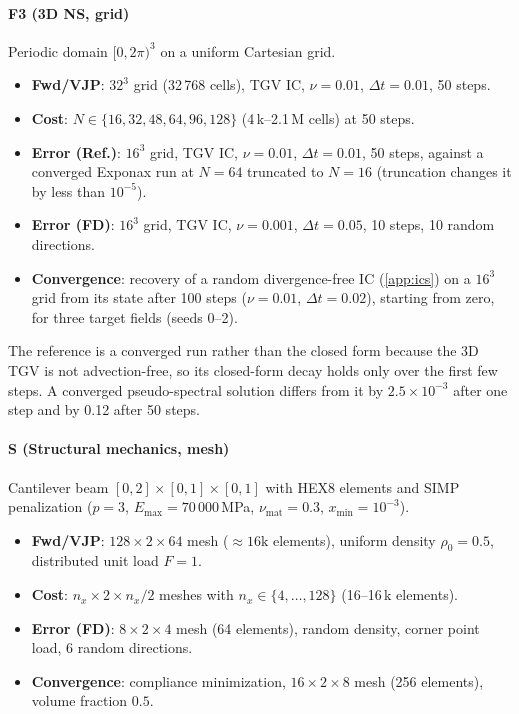 \paragraph{F3 (3D NS, grid)}
Periodic domain $[0,2\pi)^3$ on a uniform Cartesian grid.
\begin{itemize}\itemsep0pt
  \item \textbf{Fwd/VJP}: $32^3$ grid (32\,768 cells), TGV IC, $\nu=0.01$,
        $\Delta t=0.01$, 50 steps.
  \item \textbf{Cost}: $N\in\{16,32,48,64,96,128\}$ (4\,k--2.1\,M cells) at 50 steps.
  \item \textbf{Error (Ref.)}: $16^3$ grid, TGV IC, $\nu=0.01$, $\Delta t=0.01$,
        50 steps, against a converged Exponax run at $N=64$ truncated to $N=16$
        (truncation changes it by less than $10^{-5}$).
  \item \textbf{Error (FD)}: $16^3$ grid, TGV IC, $\nu=0.001$, $\Delta t=0.05$,
        10 steps, 10 random directions.
  \item \textbf{Convergence}: recovery of a random divergence-free IC
        (\cref{app:ics}) on a $16^3$ grid from its state after 100 steps
        ($\nu=0.01$, $\Delta t=0.02$), starting from zero, for three target
        fields (seeds 0--2).
\end{itemize}
The reference is a converged run rather than the closed form because the 3D TGV
is not advection-free, so its closed-form decay holds only over the first few
steps. A converged pseudo-spectral solution differs from it by
$2.5\times10^{-3}$ after one step and by 0.12 after 50 steps.

\paragraph{S (Structural mechanics, mesh)}
Cantilever beam $[0,2]\times[0,1]\times[0,1]$ with HEX8 elements and SIMP
penalization ($p=3$, $E_\text{max}=70\,000$\,MPa, $\nu_\text{mat}=0.3$,
$x_\text{min}=10^{-3}$).
\begin{itemize}\itemsep0pt
  \item \textbf{Fwd/VJP}: $128\times2\times64$ mesh (${\approx}16\text{k}$
        elements), uniform density $\rho_0=0.5$, distributed unit load $F=1$.
  \item \textbf{Cost}: $n_x\times2\times n_x/2$ meshes with
        $n_x\in\{4,\ldots,128\}$ (16--16\,k elements).
  \item \textbf{Error (FD)}: $8\times2\times4$ mesh (64 elements), random
        density, corner point load, 6 random directions.
  \item \textbf{Convergence}: compliance minimization, $16\times2\times8$ mesh
        (256 elements), volume fraction $0.5$.
\end{itemize}

